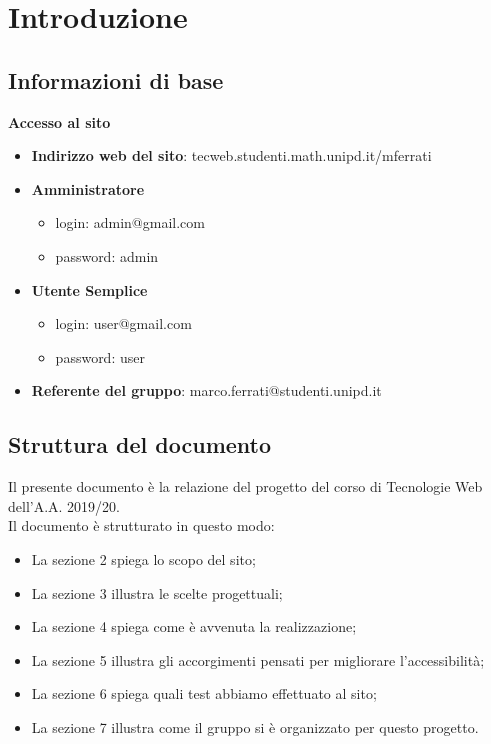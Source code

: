 \documentclass[1_relazione.tex]{subfiles}
\begin{document}
\section{Introduzione}

\subsection{Informazioni di base}
\textbf{Accesso al sito}

\begin{itemize}
\item \textbf{Indirizzo web del sito}: tecweb.studenti.math.unipd.it/mferrati
\item \textbf{Amministratore}
	\begin{itemize}
	\item login: admin@gmail.com
	\item password: admin
	\end{itemize}
\item \textbf{Utente Semplice}
	\begin{itemize}
	\item login: user@gmail.com
	\item password: user
	\end{itemize}
\item \textbf{Referente del gruppo}: marco.ferrati@studenti.unipd.it 
\end{itemize}

\subsection{Struttura del documento}
Il presente documento \`{e} la relazione del progetto del corso di Tecnologie Web dell'A.A. 2019/20. \\Il documento \`{e} strutturato in questo modo:
\begin{itemize}
	\item La sezione 2 spiega lo scopo del sito;
	\item La sezione 3 illustra le scelte progettuali;
	\item La sezione 4 spiega come \`{e} avvenuta la realizzazione;
	\item La sezione 5 illustra gli accorgimenti pensati per migliorare l'accessibilit\`{a};
	\item La sezione 6 spiega quali test abbiamo effettuato al sito;
	\item La sezione 7 illustra come il gruppo si \`{e} organizzato per questo progetto.
\end{itemize}
\end{document}

